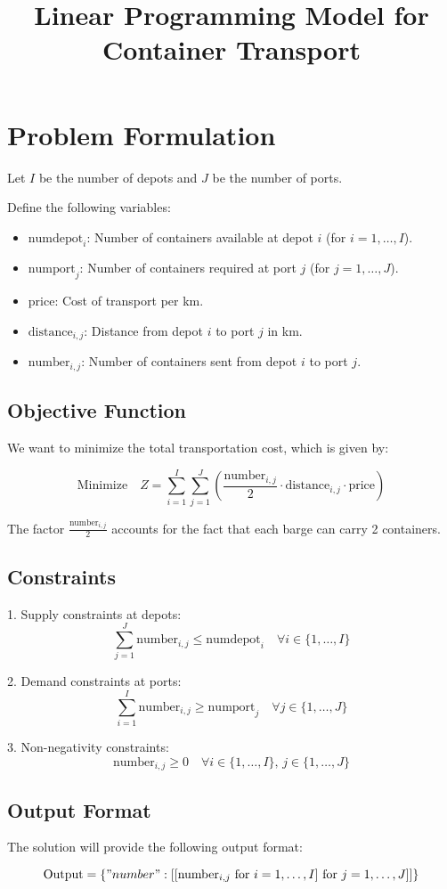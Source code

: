 \documentclass{article}
\begin{document}
\title{Linear Programming Model for Container Transport}
\author{}
\date{}
\maketitle

\section*{Problem Formulation}

Let \( I \) be the number of depots and \( J \) be the number of ports. 

Define the following variables:
\begin{itemize}
    \item \( \text{numdepot}_{i} \): Number of containers available at depot \( i \) (for \( i = 1, \ldots, I \)).
    \item \( \text{numport}_{j} \): Number of containers required at port \( j \) (for \( j = 1, \ldots, J \)).
    \item \( \text{price} \): Cost of transport per km.
    \item \( \text{distance}_{i,j} \): Distance from depot \( i \) to port \( j \) in km.
    \item \( \text{number}_{i,j} \): Number of containers sent from depot \( i \) to port \( j \).
\end{itemize}

\subsection*{Objective Function}

We want to minimize the total transportation cost, which is given by:

\[
\text{Minimize} \quad Z = \sum_{i=1}^{I} \sum_{j=1}^{J} \left( \frac{\text{number}_{i,j}}{2} \cdot \text{distance}_{i,j} \cdot \text{price} \right)
\]

The factor \( \frac{\text{number}_{i,j}}{2} \) accounts for the fact that each barge can carry 2 containers.

\subsection*{Constraints}

1. Supply constraints at depots:
\[
\sum_{j=1}^{J} \text{number}_{i,j} \leq \text{numdepot}_{i} \quad \forall i \in \{1, \ldots, I\}
\]

2. Demand constraints at ports:
\[
\sum_{i=1}^{I} \text{number}_{i,j} \geq \text{numport}_{j} \quad \forall j \in \{1, \ldots, J\}
\]

3. Non-negativity constraints:
\[
\text{number}_{i,j} \geq 0 \quad \forall i \in \{1, \ldots, I\}, \, j \in \{1, \ldots, J\}
\]

\subsection*{Output Format}

The solution will provide the following output format:

\[
\text{Output} = \{ "number": [[\text{number}_{i,j} \text{ for } i=1,\ldots,I] \text{ for } j=1,\ldots,J] ] \}
\]
\end{document}
